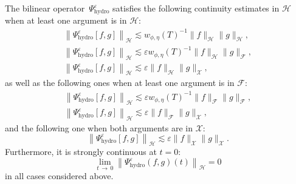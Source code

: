 \documentclass[AHL,Unicode,longabstracts,published]{cedram}
\newcommand{\hyd}{\mathrm{hydro}}
\newcommand{\HH}{\mathcal{H}}
\newcommand{\FFF}{\mathscr{F}}
\newcommand{\HHH}{\mathscr{H}}
\newcommand{\GGG}{\mathscr{X}}
\newcommand{\SSs}{\HH}
\newcommand{\SSSs}{\HHH}
\newcommand{\SSSl}{\GGG}
\newcommand{\SSSm}{\FFF}
\newcommand*\eps{{\varepsilon}}
\begin{document}
\begin{prop}\label{prop:bilinear_hydrodynamic}
The bilinear operator~$\Psi^\eps_\hyd$ satisfies the following continuity estimates in $\SSSs$ when at least one argument is in $\SSSs$:
\begin{subequations}\label{eq:bilinear_hyd_hyd}
\begin{gather}
\left\| \Psi^\eps_\hyd [f, g] \right\|_\SSSs \lesssim w_{\phi, \eta}(T)^{-1} \| f \|_\SSSs \| g \|_\SSSs,\label{eq:bilinear_hyd_hyd_hyd}\\
\left\| \Psi^\eps_\hyd [f, g] \right\|_\SSSs \lesssim \eps w_{\phi, \eta}(T)^{-1} \| f \|_\SSSs \| g \|_\SSSm,\label{eq:bilinear_hyd_hyd_mix}\\
\left\| \Psi^\eps_\hyd [f, g] \right\|_\SSSs \lesssim \eps \| f \|_\SSSs \| g \|_\SSSl,\label{eq:bilinear_hyd_hyd_kin}
\end{gather}
\end{subequations}
as well as the following ones when at least one argument is in $\SSSm$:
\begin{subequations}\label{eq:bilinear_hyd_mix}
\begin{gather}
\left\| \Psi^\eps_\hyd [f, g] \right\|_\SSSs \lesssim \eps w_{\phi, \eta}(T)^{-1} \| f \|_\SSSm \| g \|_\SSSm,\label{eq:bilinear_hyd_mix_mix}\\
\left\| \Psi^\eps_\hyd [f, g] \right\|_\SSSs \lesssim \eps \| f \|_\SSSm \| g \|_\SSSl,\label{eq:bilinear_hyd_mix_kin}
\end{gather}
\end{subequations}
and the following one when both arguments are in $\SSSl$:
\begin{equation}\label{eq:bilinear_hyd_kin_kin}
\left\| \Psi^\eps_\hyd [f, g] \right\|_\SSSs \lesssim \eps \| f \|_\SSSl \| g \|_\SSSl.
\end{equation}
Furthermore, it is strongly continuous at $t=0$:
\[
\lim_{t\,\to\,0}\left\| \Psi_\hyd^\eps(f, g)(t) \right\|_{\SSs}=0
\]
in all cases considered above.
\end{prop}
\end{document}
